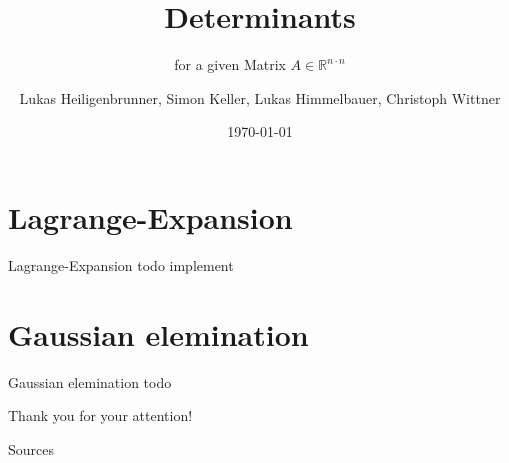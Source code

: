 \documentclass[usenames,dvipsnames]{beamer}
\title{Determinants}
\subtitle{for a given Matrix $A \in \mathbb{R}^{n \cdot n}$}
\author{Lukas Heiligenbrunner, Simon Keller, Lukas Himmelbauer, Christoph Wittner}
\date{\today}
\begin{document}

    \begin{frame}
        \maketitle
    \end{frame}



    \section{Lagrange-Expansion} %


    \begin{frame}{Lagrange-Expansion}
        todo implement
    \end{frame}



    \section{Gaussian elemination} %


    \begin{frame}{Gaussian elemination}
        todo
    \end{frame}


    \begin{frame}[focus]
        Thank you for your attention!
    \end{frame}


    \appendix

    \begin{frame}{Sources}
        \nocite{*} %
        
        
    \end{frame}
\end{document}
